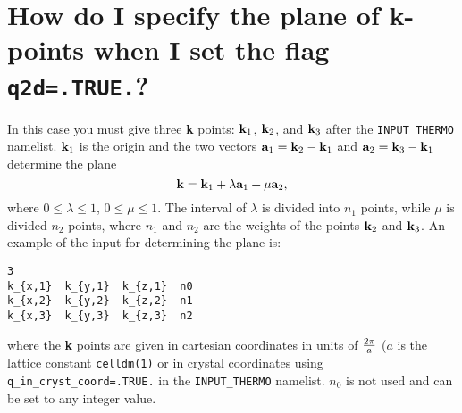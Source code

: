\documentclass[12pt,a4paper,twoside]{report}
\begin{document}
\newpage
{\color{coral}\section{How do I specify the plane of {\bf k}-points 
when I set the flag \texttt{q2d=.TRUE.}?}}
\color{black}
In this case you must give three {\bf k} points: ${\bf k}_1$, 
${\bf k}_2$, and ${\bf k}_3$ after the \texttt{INPUT\_THERMO} 
namelist.
${\bf k}_1$ is the origin and the
two vectors ${\bf a}_1={\bf k}_2 - {\bf k}_1$ and ${\bf a}_2=
{\bf k}_3 - {\bf k}_1$ determine the plane
\begin{equation}
{\bf k} = {\bf k}_1 + \lambda {\bf a}_1 + \mu {\bf a}_2,
\end{equation}
where $0\le \lambda  \le 1$, $0\le \mu  \le 1$. The interval
of $\lambda$ is divided into $n_1$ points, while $\mu$ is divided
$n_2$ points, where $n_1$ and $n_2$ are the weights of the points
${\bf k}_2$ and ${\bf k}_3$.
An example of the input for determining the plane is:
\begin{verbatim}
3
k_{x,1}  k_{y,1}  k_{z,1}  n0
k_{x,2}  k_{y,2}  k_{z,2}  n1
k_{x,3}  k_{y,3}  k_{z,3}  n2
\end{verbatim}
where the {\bf k} points are given in cartesian coordinates in
units of $2\pi \over a$ ($a$ is the lattice constant \texttt{celldm(1)} 
or in crystal coordinates using \texttt{q\_in\_cryst\_coord=.TRUE.}
in the \texttt{INPUT\_THERMO} namelist.
$n_0$ is not used and can be set to any integer value.
\end{document}
